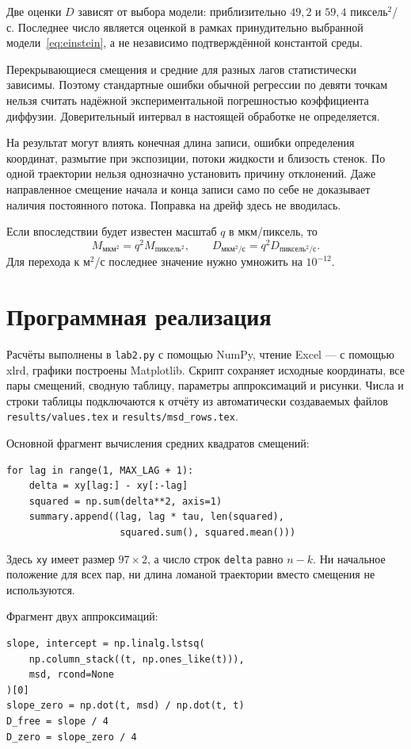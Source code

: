 \documentclass[12pt,a4paper]{article}
\begin{document}
Две оценки $D$ зависят от выбора модели: приблизительно
$49{,}2$ и $59{,}4$ пиксель$^2$/с. Последнее число является оценкой
в рамках принудительно выбранной модели~\eqref{eq:einstein},
а не независимо подтверждённой константой среды.

Перекрывающиеся смещения и средние для разных лагов статистически
зависимы. Поэтому стандартные ошибки обычной регрессии по девяти точкам
нельзя считать надёжной экспериментальной погрешностью коэффициента
диффузии. Доверительный интервал в настоящей обработке не определяется.

На результат могут влиять конечная длина записи, ошибки определения
координат, размытие при экспозиции, потоки жидкости и близость стенок.
По одной траектории нельзя однозначно установить причину отклонений.
Даже направленное смещение начала и конца записи само по себе не доказывает
наличия постоянного потока. Поправка на дрейф здесь не вводилась.

Если впоследствии будет известен масштаб $q$ в мкм/пиксель, то
\[
 M_{\text{мкм}^2}=q^2M_{\text{пиксель}^2},\qquad
 D_{\text{мкм}^2/\text{с}}=q^2D_{\text{пиксель}^2/\text{с}}.
\]
Для перехода к м$^2$/с последнее значение нужно умножить на $10^{-12}$.

\clearpage
\section{Программная реализация}
Расчёты выполнены в \texttt{lab2.py} с помощью NumPy, чтение Excel ---
с помощью xlrd, графики построены Matplotlib. Скрипт сохраняет исходные
координаты, все пары смещений, сводную таблицу, параметры аппроксимаций
и рисунки. Числа и строки таблицы подключаются к отчёту из автоматически
создаваемых файлов \texttt{results/values.tex} и
\texttt{results/msd\_rows.tex}.

Основной фрагмент вычисления средних квадратов смещений:
\begin{lstlisting}
for lag in range(1, MAX_LAG + 1):
    delta = xy[lag:] - xy[:-lag]
    squared = np.sum(delta**2, axis=1)
    summary.append((lag, lag * tau, len(squared),
                    squared.sum(), squared.mean()))
\end{lstlisting}
Здесь \texttt{xy} имеет размер $97\times2$, а число строк
\texttt{delta} равно $n-k$. Ни начальное положение для всех пар,
ни длина ломаной траектории вместо смещения не используются.

Фрагмент двух аппроксимаций:
\begin{lstlisting}
slope, intercept = np.linalg.lstsq(
    np.column_stack((t, np.ones_like(t))),
    msd, rcond=None
)[0]
slope_zero = np.dot(t, msd) / np.dot(t, t)
D_free = slope / 4
D_zero = slope_zero / 4
\end{lstlisting}
\end{document}
